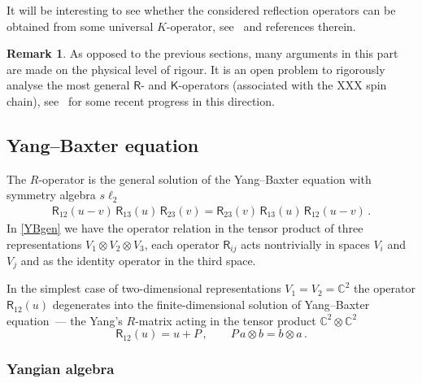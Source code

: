 \documentclass[11pt]{article}
\numberwithin{equation}{section}
\theoremstyle{plain}
\theoremstyle{definition}
\newtheorem{remark}{Remark}
\newcommand{\R}{\mathsf{R}}
\newcommand{\K}{\mathsf{K}}
\begin{document}
It will be interesting to see whether the considered reflection operators can be obtained from some universal $K$-operator, see~\cite{AV} and references therein.

\begin{remark}
	As opposed to the previous sections, many arguments in this part are made on the physical level of rigour. It is an open problem to rigorously analyse the most general $\R$- and $\K$-operators (associated with the XXX spin chain), see~\cite{N} for some recent progress in this direction.
\end{remark}


\subsection{Yang--Baxter equation}

The $R$-operator is the general solution of the Yang--Baxter equation with symmetry algebra $s\ell_2$
\begin{align} \label{YBgen}
	\R_{12}(u-v)\,\R_{13}(u)\,\R_{23}(v) = 
	\R_{23}(v)\,\R_{13}(u)\,\R_{12}(u-v) \,.
\end{align}
In \eqref{YBgen} we have the operator relation in the tensor product of three representations $V_1\otimes V_2\otimes V_3$, each operator $\R_{ij}$ acts nontrivially in spaces $V_i$ and $V_j$ and as the identity operator in the third space.

In the simplest case of two-dimensional representations $V_1=V_2=\mathbb{C}^2$ the operator $\R_{12}(u)$ degenerates into the finite-dimensional solution of Yang--Baxter equation~--- the Yang's $R$-matrix acting 
in the tensor product $\mathbb{C}^2\otimes \mathbb{C}^2$
\begin{equation} \nonumber
	\R_{12}(u) = u  + P \,, \qquad P\,a \otimes b = b \otimes a \,.
\end{equation}

\subsubsection{Yangian algebra}
\end{document}
